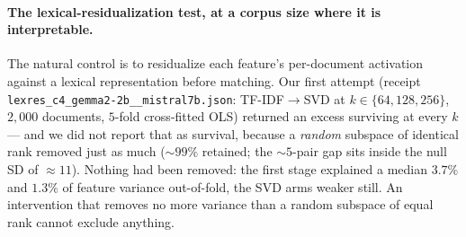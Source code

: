 \paragraph{The lexical-residualization test, at a corpus size where it is interpretable.}\label{app:lexres} The natural control is to residualize each feature's per-document activation against a lexical representation before matching. Our first attempt (receipt \texttt{lexres\_c4\_gemma2-2b\_\_mistral7b.json}: TF-IDF$\to$SVD at $k\in\{64,128,256\}$, $2{,}000$ documents, $5$-fold cross-fitted OLS) returned an excess surviving at every $k$ --- and we did not report that as survival, because a \emph{random} subspace of identical rank removed just as much (${\sim}99\%$ retained; the ${\sim}5$-pair gap sits inside the null SD of ${\approx}11$). Nothing had been removed: the first stage explained a median $3.7\%$ and $1.3\%$ of feature variance out-of-fold, the SVD arms weaker still. An intervention that removes no more variance than a random subspace of equal rank cannot exclude anything.

